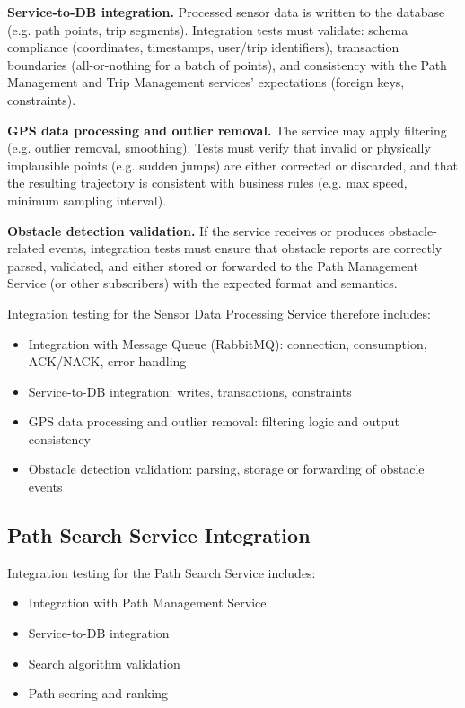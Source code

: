 \textbf{Service-to-DB integration.}
Processed sensor data is written to the database (e.g. path points, trip segments). Integration tests must validate: schema compliance (coordinates, timestamps, user/trip identifiers), transaction boundaries (all-or-nothing for a batch of points), and consistency with the Path Management and Trip Management services' expectations (foreign keys, constraints).

\textbf{GPS data processing and outlier removal.}
The service may apply filtering (e.g. outlier removal, smoothing). Tests must verify that invalid or physically implausible points (e.g. sudden jumps) are either corrected or discarded, and that the resulting trajectory is consistent with business rules (e.g. max speed, minimum sampling interval).

\textbf{Obstacle detection validation.}
If the service receives or produces obstacle-related events, integration tests must ensure that obstacle reports are correctly parsed, validated, and either stored or forwarded to the Path Management Service (or other subscribers) with the expected format and semantics.

Integration testing for the Sensor Data Processing Service therefore includes:
\begin{itemize}
    \item Integration with Message Queue (RabbitMQ): connection, consumption, ACK/NACK, error handling
    \item Service-to-DB integration: writes, transactions, constraints
    \item GPS data processing and outlier removal: filtering logic and output consistency
    \item Obstacle detection validation: parsing, storage or forwarding of obstacle events
\end{itemize}

\subsection{Path Search Service Integration}
\label{subsec:path_search_service_integration}%

Integration testing for the Path Search Service includes:
\begin{itemize}
    \item Integration with Path Management Service
    \item Service-to-DB integration
    \item Search algorithm validation
    \item Path scoring and ranking
\end{itemize}

